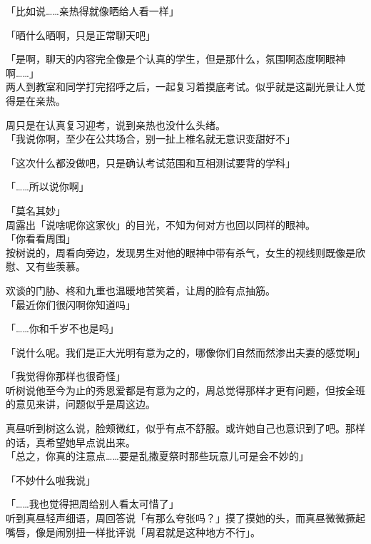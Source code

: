 「比如说……亲热得就像晒给人看一样」

「晒什么晒啊，只是正常聊天吧」

「是啊，聊天的内容完全像是个认真的学生，但是那什么，氛围啊态度啊眼神啊……」\\

两人到教室和同学打完招呼之后，一起复习着摸底考试。似乎就是这副光景让人觉得是在亲热。

周只是在认真复习迎考，说到亲热也没什么头绪。\\

「我说你啊，至少在公共场合，别一扯上椎名就无意识变甜好不」

「这次什么都没做吧，只是确认考试范围和互相测试要背的学科」

「……所以说你啊」

「莫名其妙」\\

周露出「说啥呢你这家伙」的目光，不知为何对方也回以同样的眼神。\\

「你看看周围」\\

按树说的，周看向旁边，发现男生对他的眼神中带有杀气，女生的视线则既像是欣慰、又有些羡慕。

欢谈的门胁、柊和九重也温暖地苦笑着，让周的脸有点抽筋。\\

「最近你们很闪啊你知道吗」

「……你和千岁不也是吗」

「说什么呢。我们是正大光明有意为之的，哪像你们自然而然渗出夫妻的感觉啊」

「我觉得你那样也很奇怪」\\

听树说他至今为止的秀恩爱都是有意为之的，周总觉得那样才更有问题，但按全班的意见来讲，问题似乎是周这边。

真昼听到树这么说，脸颊微红，似乎有点不舒服。或许她自己也意识到了吧。那样的话，真希望她早点说出来。\\

「总之，你真的注意点……要是乱撒夏祭时那些玩意儿可是会不妙的」

「不妙什么啦我说」

「……我也觉得把周给别人看太可惜了」\\

听到真昼轻声细语，周回答说「有那么夸张吗？」摸了摸她的头，而真昼微微撅起嘴唇，像是闹别扭一样批评说「周君就是这种地方不行」。
